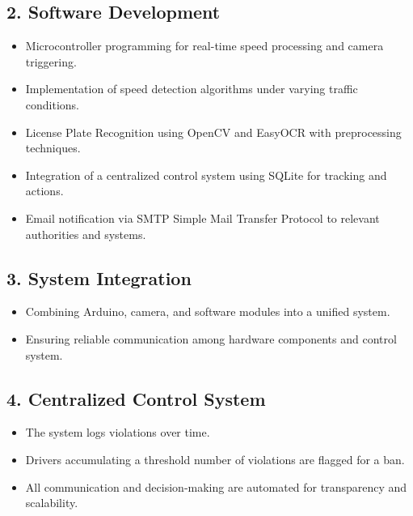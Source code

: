 \subsection*{2. Software Development}
\begin{itemize}
  \item Microcontroller programming for real-time speed processing and camera triggering.
  \item Implementation of speed detection algorithms under varying traffic conditions.
  \item License Plate Recognition using OpenCV and EasyOCR with preprocessing techniques.
  \item Integration of a centralized control system using SQLite for tracking and actions.
  \item Email notification via SMTP Simple Mail Transfer Protocol to relevant authorities and systems.
\end{itemize}

\subsection*{3. System Integration}
\begin{itemize}
  \item Combining Arduino, camera, and software modules into a unified system.
  \item Ensuring reliable communication among hardware components and control system.
\end{itemize}

\subsection*{4. Centralized Control System}
\begin{itemize}
  \item The system logs violations over time.
  \item Drivers accumulating a threshold number of violations are flagged for a ban.
  \item All communication and decision-making are automated for transparency and scalability.
\end{itemize}
